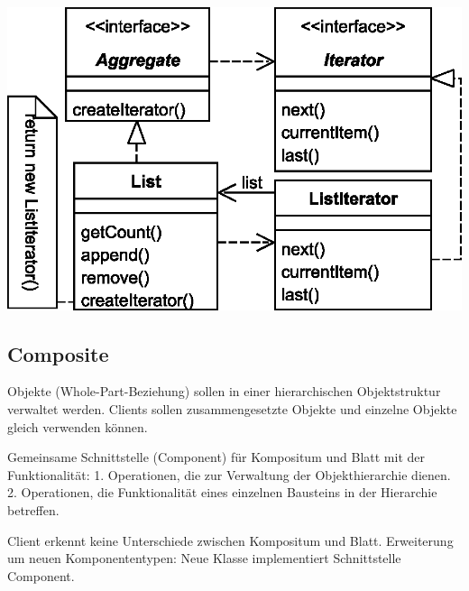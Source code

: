 \documentclass[a4paper,fontsize=9pt, DIV=calc]{scrartcl}
\begin{document}
\begin{multicols}{2}
\begin{center}
\includegraphics[width=0.85\columnwidth]{new/iteratoruml}
\end{center}

\subsection{Composite}

\begin{description}[leftmargin=*]\itemsep-2mm
\item[Motivation und Problem] Objekte (Whole-Part-Beziehung) sollen in einer hierarchischen Objektstruktur verwaltet werden. Clients sollen zusammengesetzte Objekte und einzelne Objekte gleich verwenden können.
\item[Lösung] Gemeinsame Schnittstelle (Component) für Kompositum und Blatt mit der Funktionalität: 1. Operationen, die zur Verwaltung der Objekthierarchie dienen. 2. Operationen, die Funktionalität eines einzelnen Bausteins in der Hierarchie betreffen.
\item[Konsequenzen] Client erkennt keine Unterschiede zwischen Kompositum und Blatt. Erweiterung um neuen Komponententypen: Neue Klasse implementiert Schnittstelle Component.
\end{description}



\end{multicols}
\end{document}
